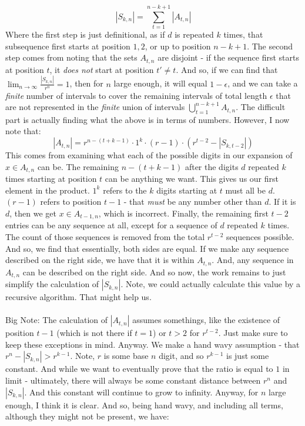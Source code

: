 \documentclass[12pt,a4paper]{article}
\newcommand{\1}[1]{\mathbbm{1}\left\{ #1 \right\}}
\begin{document}
\begin{enumerate}
$$		|S_{k,n}| = \sum_{t=1}^{n-k+1} |A_{t,n}|
	$$
	Where the first step is just definitional, as if $d$ is repeated $k$ times, that subsequence first starts at position $1, 2$, or up to position $n - k + 1$. The second step comes from noting that the sets $A_{t,n}$ are disjoint - if the sequence first starts at position $t$, it \textit{does not} start at position $t' \neq t$. And so, if we can find that $\lim_{n \to \infty} \frac{|S_{k,n}|}{r^n} = 1$, then for $n$ large enough, it will equal $1 - \epsilon$, and we can take a \textit{finite} number of intervals to cover the remaining intervals of total length $\epsilon$ that are not represented in the \textit{finite} union of intervals $\bigcup_{t=1}^{n-k+1} A_{t,n}$. The difficult part is actually finding what the above is in terms of numbers. However, I now note that:
	$$
		|A_{t,n}| = r^{n - (t + k - 1)} \cdot 1^k \cdot (r - 1) \cdot (r^{t - 2} - |S_{k,t-2}|)
	$$
	This comes from examining what each of the possible digits in our expansion of $x \in A_{t,n}$ can be. The remaining $n - (t + k - 1)$ after the digits $d$ repeated $k$ times starting at position $t$ can be anything we want. This gives us our first element in the product. $1^k$ refers to the $k$ digits starting at $t$ must all be $d$. $(r-1)$ refers to position $t - 1$ - that \textit{must} be any number other than $d$. If it is $d$, then we get $x \in A_{t-1,n}$, which is incorrect. Finally, the remaining first $t-2$ entries can be any sequence at all, except for a sequence of $d$ repeated $k$ times. The count of those sequences is removed from the total $r^{t-2}$ sequences possible. And so, we find that essentially, both sides are equal. If we make any sequence described on the right side, we have that it is within $A_{t,n}$. And, any sequence in $A_{t,n}$ can be described on the right side. And so now, the work remains to just simplify the calculation of $|S_{k,n}|$. Note, we could actually calculate this value by a recursive algorithm. That might help us.
	\\\\
	Big Note: The calculation of $|A_{t,n}|$ assumes somethings, like the existence of position $t - 1$ (which is not there if $t = 1$) or $t > 2$ for $r^{t - 2}$. Just make sure to keep these exceptions in mind. Anyway. We make a hand wavy assumption - that $r^n - |S_{k,n}| > r^{k-1}$. Note, $r$ is some base $n$ digit, and so $r^{k-1}$ is just some constant. And while we want to eventually prove that the ratio is equal to $1$ in limit - ultimately, there will always be some constant distance between $r^n$ and $|S_{k,n}|$. And this constant will continue to grow to infinity. Anyway, for $n$ large enough, I think it is clear. And so, being hand wavy, and including all terms, although they might not be present, we have:

\end{enumerate}
\end{document}
